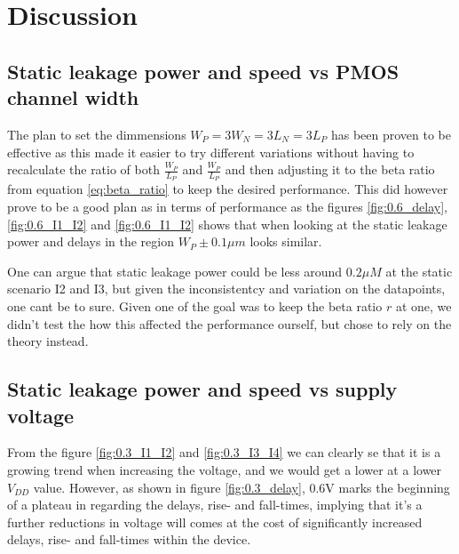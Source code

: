 \section{Discussion}

\subsection{Static leakage power and speed vs PMOS channel width}
The plan to set the dimmensions $W_P=3W_N=3L_N=3L_P$ has been proven to be effective as this made it easier to try different variations without having to recalculate the ratio of both $\frac{W_P}{L_P}$ and $\frac{W_P}{L_P}$ and then adjusting it to the beta ratio from equation \ref{eq:beta_ratio} to keep the desired performance. This did however prove to be a good plan as in terms of performance as the figures \ref{fig:0.6_delay}, \ref{fig:0.6_I1_I2} and \ref{fig:0.6_I1_I2} shows that when looking at the static leakage power and delays in the region $W_P \pm 0.1\mu m$ looks similar.

 One can argue that static leakage power could be less around $0.2\mu M$ at the static scenario I2 and I3, but given the inconsistentcy and variation on the datapoints, one cant be to sure. Given one of the goal was to keep the beta ratio $r$ at one, we didn't test the how this affected the performance ourself, but chose to rely on the theory instead.

 \subsection{Static leakage power and speed vs supply voltage}
 From the figure \ref{fig:0.3_I1_I2} and \ref{fig:0.3_I3_I4} we can clearly se that it is a growing trend when increasing the voltage, and we would get a lower at a lower $V_{DD}$ value. However, as shown in figure \ref{fig:0.3_delay}, 0.6V marks the beginning of a plateau in regarding the delays, rise- and fall-times, implying that it's a further reductions in voltage will comes at the cost of significantly increased delays, rise- and fall-times within the device.

 
